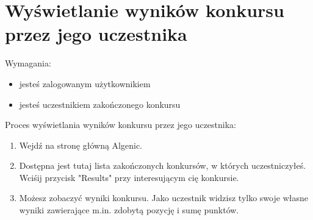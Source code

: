 \documentclass{article}
\begin{document}
\section{Wyświetlanie wyników konkursu przez jego uczestnika}
Wymagania:
\begin{itemize}
	\item jesteś zalogowanym użytkownikiem
	\item jesteś uczestnikiem zakończonego konkursu
\end{itemize}
Proces wyświetlania wyników konkursu przez jego uczestnika:
\begin{enumerate}
	\item Wejdź na stronę główną Algenic.
	\item Dostępna jest tutaj lista zakończonych konkursów, w których uczestniczyłeś. Wciśij przycisk "Results" przy interesującym cię konkursie.
	\item Możesz zobaczyć wyniki konkursu. Jako uczestnik widzisz tylko swoje własne wyniki zawierające m.in. zdobytą pozycję i sumę punktów.
\end{enumerate}
\end{document}
